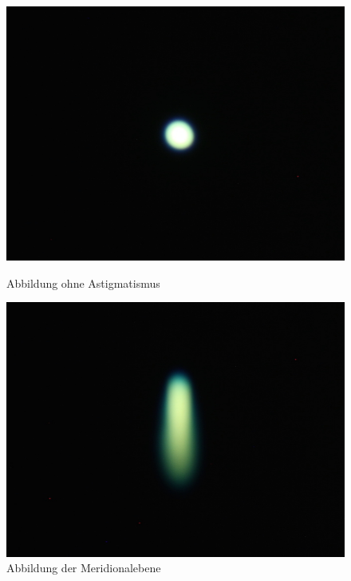 \begin{figure}[h!]
	\begin{minipage}[t]{0.48\textwidth}
		\includegraphics[width=\linewidth]{img/Astigmatismus/Prakt_Linsenfehler_2015_06_04_086}
		\caption{Abbildung ohne Astigmatismus}
		\label{fig:astigmatismus_0}
	\end{minipage}
	\hfill
	\begin{minipage}[t]{0.48\textwidth}
		\includegraphics[width=\linewidth]{img/Astigmatismus/Prakt_Linsenfehler_2015_06_04_088_meridional}
		\caption{Abbildung der Meridionalebene}
		\label{fig:astigmatismus_meridional}
	\end{minipage}
	
	\vspace{0.5cm}
	

\end{figure}
